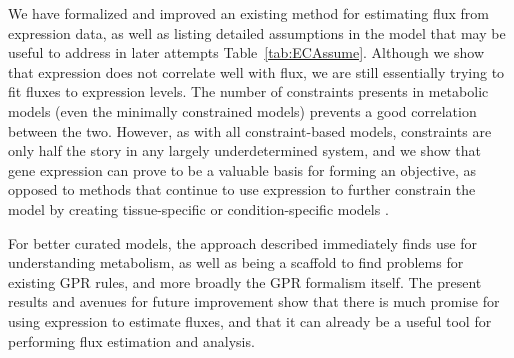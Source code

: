We have formalized and improved an existing method for estimating flux
from expression data, as well as listing detailed assumptions in the
model that may be useful to address in later attempts
Table~\ref{tab:ECAssume}.  Although we show that expression does not
correlate well with flux, we are still essentially trying to fit
fluxes to expression levels.  The number of constraints presents in
metabolic models (even the minimally constrained models) prevents 
a good correlation between the two. However, as
with all constraint-based models, constraints are only half the story in any largely
underdetermined system, and we show that gene expression can prove to
be a valuable basis for forming an objective, as opposed to methods
that continue to use expression to further constrain the model by
creating tissue-specific or condition-specific models
\citep{Shlomi2008,Becker2008}.

For better curated models, the approach described immediately finds
use for understanding metabolism, as well as being a scaffold to find
problems for existing GPR rules, and more broadly the GPR formalism itself.
The present results and avenues for future improvement
show that there is much promise for using expression to estimate
fluxes, and that it can already be a useful tool for performing flux
estimation and analysis.

